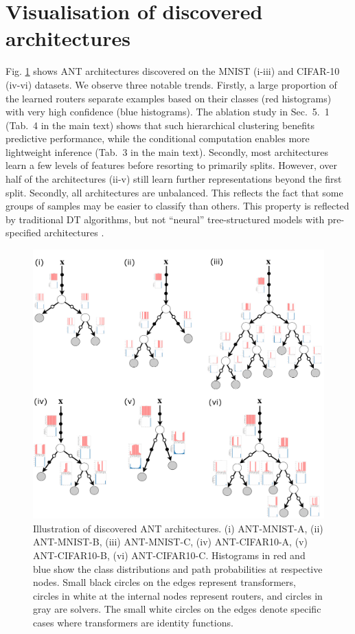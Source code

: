 \section{Visualisation of discovered architectures}\label{sec:supp_architectures}
\vspace{-2mm}
Fig. \ref{fig:architectures} shows ANT architectures discovered on the MNIST (i-iii) and CIFAR-10 (iv-vi) datasets. We observe three notable trends. Firstly, a large proportion of the learned routers separate examples based on their classes (red histograms) with very high confidence (blue histograms). The ablation study in Sec.~5.~1 (Tab.~4 in the main text) shows that such hierarchical clustering benefits predictive performance, while the conditional computation enables more lightweight inference (Tab.~3 in the main text). Secondly, most architectures learn a few levels of features before resorting to primarily splits. However, over half of the architectures (ii-v) still learn further representations beyond the first split. Secondly, all architectures are unbalanced. This reflects the fact that some groups of samples may be easier to classify than others. This property is reflected by traditional DT algorithms, but not ``neural'' tree-structured models with pre-specified architectures \citep{laptev2014convolutional,frosst2017distilling,kontschieder2015deep,ioannou2016decision}. 
\begin{figure}[ht]
	\center
	\includegraphics[width=0.8\linewidth]{figures/trees_all.pdf}
	\caption{\small Illustration of discovered ANT architectures. (i) ANT-MNIST-A, (ii) ANT-MNIST-B, (iii) ANT-MNIST-C, (iv) ANT-CIFAR10-A, (v) ANT-CIFAR10-B, (vi) ANT-CIFAR10-C. Histograms in red and blue show the class distributions and path probabilities at respective nodes. Small black circles on the edges represent transformers, circles in white at the internal nodes represent routers, and circles in gray are solvers. The small white circles on the edges denote specific cases where transformers are identity functions.}
	\label{fig:architectures}
\end{figure}


